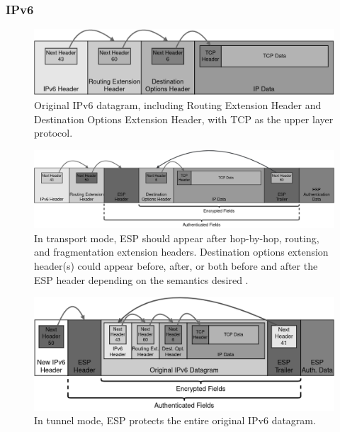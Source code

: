 \documentclass[a4paper,12pt]{report}
\begin{document}
		\subsubsection{IPv6}
		\begin{figure}[!htb]
			\includegraphics[width=\textwidth,height=0.15\textheight,keepaspectratio]{original_ipv6_packet}
			\centering
			\caption{Original IPv6 datagram, including Routing Extension Header and Destination Options Extension Header, with TCP as the upper layer protocol.}
		\end{figure}
		
		\begin{figure}[!htb]
			\includegraphics[width=\textwidth]{esp_ipv6_transport}
			\centering
			\caption{In transport mode, ESP should appear after hop-by-hop, routing, and fragmentation extension headers.  Destination options extension header(s) could appear before, after, or both before and after the ESP header depending on the semantics desired \cite{rfc4303}.}
		\end{figure}
		
		\begin{figure}[!htb]
			\includegraphics[width=\textwidth]{esp_ipv6_tunnel}
			\centering
			\caption{In tunnel mode, ESP protects the entire original IPv6 datagram.}
		\end{figure}
	\newpage
\end{document}
